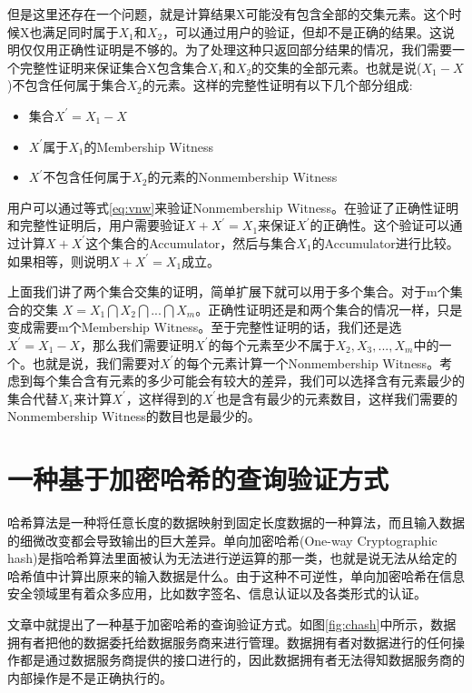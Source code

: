 但是这里还存在一个问题，就是计算结果X可能没有包含全部的交集元素。这个时候X也满足同时属于$X_1$和$X_2$，可以通过用户的验证，但却不是正确的结果。这说明仅仅用正确性证明是不够的。为了处理这种只返回部分结果的情况，我们需要一个完整性证明来保证集合X包含集合$X_1$和$X_2$的交集的全部元素。也就是说($X_1 - X$)不包含任何属于集合$X_2$的元素。这样的完整性证明有以下几个部分组成:
\begin{itemize}
\item 集合$X^\prime = X_1 - X$
\item $X^\prime$属于$X_1$的Membership Witness
\item $X^\prime$不包含任何属于$X_2$的元素的Nonmembership Witness
\end{itemize}

用户可以通过等式\ref{eq:vnw}来验证Nonmembership Witness。在验证了正确性证明和完整性证明后，用户需要验证$X + X^\prime = X_1$来保证$X^\prime$的正确性。这个验证可以通过计算$X + X^\prime$这个集合的Accumulator，然后与集合$X_1$的Accumulator进行比较。如果相等，则说明$X + X^\prime = X_1$成立。

上面我们讲了两个集合交集的证明，简单扩展下就可以用于多个集合。对于m个集合的交集 $X = X_1 \bigcap X_2 \bigcap ... \bigcap X_m$。正确性证明还是和两个集合的情况一样，只是变成需要m个Membership Witness。至于完整性证明的话，我们还是选$X^\prime = X_1 - X$，那么我们需要证明$X^\prime$的每个元素至少不属于$X_2, X_3,...,X_m$中的一个。也就是说，我们需要对$X^\prime$的每个元素计算一个Nonmembership Witness。考虑到每个集合含有元素的多少可能会有较大的差异，我们可以选择含有元素最少的集合代替$X_1$来计算$X^\prime$，这样得到的$X^\prime$也是含有最少的元素数目，这样我们需要的Nonmembership Witness的数目也是最少的。

\section{一种基于加密哈希的查询验证方式}
哈希算法是一种将任意长度的数据映射到固定长度数据的一种算法，而且输入数据的细微改变都会导致输出的巨大差异。单向加密哈希(One-way Cryptographic hash)是指哈希算法里面被认为无法进行逆运算的那一类，也就是说无法从给定的哈希值中计算出原来的输入数据是什么。由于这种不可逆性，单向加密哈希在信息安全领域里有着众多应用，比如数字签名、信息认证以及各类形式的认证。

文章\cite{sion2005query}中就提出了一种基于加密哈希的查询验证方式。如图\ref{fig:chash}中所示，数据拥有者把他的数据委托给数据服务商来进行管理。数据拥有者对数据进行的任何操作都是通过数据服务商提供的接口进行的，因此数据拥有者无法得知数据服务商的内部操作是不是正确执行的。

